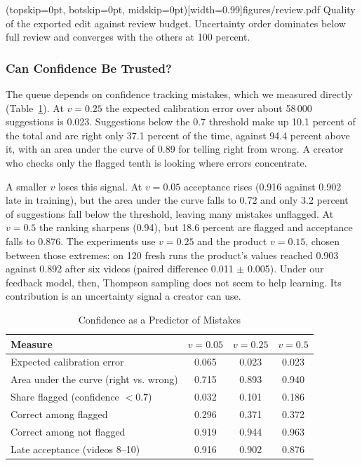 \documentclass{ieeeaccess}
\begin{document}
\Figure[t!](topskip=0pt, botskip=0pt, midskip=0pt)[width=0.99\columnwidth]{figures/review.pdf}
{Quality of the exported edit against review budget. Uncertainty order dominates below full review and converges with the others at 100 percent.\label{fig:review}}


\subsubsection{Can Confidence Be Trusted?}
The queue depends on confidence tracking mistakes, which we measured directly (Table~\ref{tab:calib}). At $v=0.25$ the expected calibration error over about 58\,000 suggestions is 0.023. Suggestions below the 0.7 threshold make up 10.1 percent of the total and are right only 37.1 percent of the time, against 94.4 percent above it, with an area under the curve of 0.89 for telling right from wrong. A creator who checks only the flagged tenth is looking where errors concentrate.

A smaller $v$ loses this signal. At $v=0.05$ acceptance rises (0.916 against 0.902 late in training), but the area under the curve falls to 0.72 and only 3.2 percent of suggestions fall below the threshold, leaving many mistakes unflagged. At $v=0.5$ the ranking sharpens (0.94), but 18.6 percent are flagged and acceptance falls to 0.876. The experiments use $v=0.25$ and the product $v=0.15$, chosen between those extremes: on 120 fresh runs the product's values reached 0.903 against 0.892 after six videos (paired difference 0.011 $\pm$ 0.005). Under our feedback model, then, Thompson sampling does not seem to help learning. Its contribution is an uncertainty signal a creator can use.

\begin{table}[t]
\caption{Confidence as a Predictor of Mistakes}
\label{tab:calib}
\setlength{\tabcolsep}{3pt}
\centering
\begin{tabular}{|l|c|c|c|}
\hline
Measure & $v=0.05$ & $v=0.25$ & $v=0.5$ \\
\hline
Expected calibration error & 0.065 & 0.023 & 0.023 \\
Area under the curve (right vs. wrong) & 0.715 & 0.893 & 0.940 \\
Share flagged (confidence $<0.7$) & 0.032 & 0.101 & 0.186 \\
Correct among flagged & 0.296 & 0.371 & 0.372 \\
Correct among not flagged & 0.919 & 0.944 & 0.963 \\
Late acceptance (videos 8--10) & 0.916 & 0.902 & 0.876 \\
\hline
\end{tabular}
\end{table}
\end{document}
